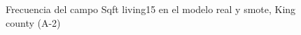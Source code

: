 \begin{figure}[H]
    \centering
    
    \caption{Frecuencia del campo Sqft living15 en el modelo real y smote, King county (A-2)}
    \label{frecuency-smote-sqft living15}
\end{figure}